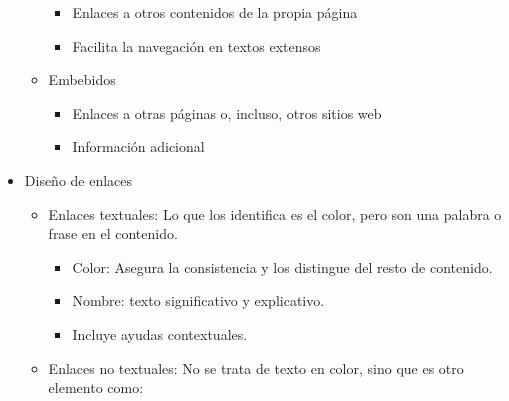 \documentclass[12pt, twoside, openright]{report} %
\begin{document}
\begin{itemize}
\begin{itemize}
          \begin{itemize}
          
            \item
              Enlaces a otros contenidos de la propia página
            \item
              Facilita la navegación en textos extensos
          \end{itemize}
        \item
          Embebidos

          \begin{itemize}
          
            \item
              Enlaces a otras páginas o, incluso, otros sitios web
            \item
              Información adicional
          \end{itemize}
      \end{itemize}
    \item Diseño de enlaces

      \begin{itemize}
      
        \item
          Enlaces textuales: Lo que los identifica es el color, pero son
          una palabra o frase en el contenido.

          \begin{itemize}
          
            \item
              Color: Asegura la consistencia y los distingue del resto de
              contenido.
            \item
              Nombre: texto significativo y explicativo.
            \item
              Incluye ayudas contextuales.
          \end{itemize}
        \item
          Enlaces no textuales: No se trata de texto en color, sino que
          es otro elemento como:

          \begin{itemize}
          

\end{itemize}
\end{itemize}
\end{itemize}
\end{document}
